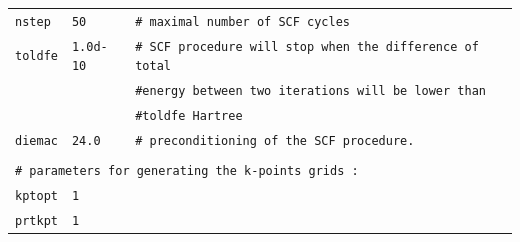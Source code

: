 \documentclass[11pt,a4paper]{article}
\begin{document}
\begin{center}
\begin{tabular}{lll}
\texttt{nstep} & \texttt{50} &\texttt{\# maximal number of SCF cycles}\\
\texttt{toldfe} & \texttt{1.0d-10} &\texttt{\# SCF procedure will stop when the difference of total}\\
&&\texttt{\#\space\space\space\space energy between two iterations will be lower than}\\
&&\texttt{\#\space\space\space\space toldfe Hartree}\\
\texttt{diemac} &\texttt{24.0} & \texttt{\# preconditioning of the SCF procedure.}\\
&&\\
\multicolumn{3}{l}{\texttt{\# parameters for generating the k-points grids : }}\\
\texttt{kptopt} & \texttt{1} &\\
\texttt{prtkpt} & \texttt{1} 
\end{tabular}
\end{center} 
\newpage
\end{document}
